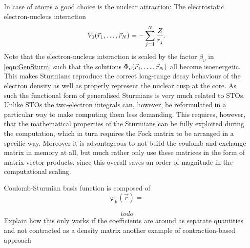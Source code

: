 In case of atoms a good choice is the nuclear attraction:
The electrostatic electron-nucleus interaction
\[
	V_0(\vec{r}_1, \ldots, \vec{r}_N) = - \sum_{j=1}^N \frac{Z}{r_j}.
\]
Note that the electron-nucleus interaction is scaled by the factor $\beta_\nu$ in \eqref{eqn:GenSturm}
such that the solutions $\Phi_\nu(\vec{r}_1, \ldots, \vec{r}_N)$ all become isoenergetic.
This makes Sturmians reproduce the correct long-range decay behaviour of the electron density
as well as properly represent the nuclear cusp at the core.
As such the functional form of generalised Sturmians is very much related to STOs.
Unlike STOs the two-electron integrals can, however, be reformulated in a particular way
to make computing them less demanding.
This requires, however, that the mathematical properties of the Sturmians
can be fully exploited during the computation,
which in turn requires the Fock matrix to be arranged in a specific way.
Moreover it is advantageous to not build the coulomb and exchange matrix in memory at all,
but much rather only use these matrices in the form of matrix-vector products,
since this overall saves an order of magnitude in the computational scaling.


Coulomb-Sturmian basis function is composed of
\[ \varphi_\mu(\vec{r}) = \]



\begin{equation}
	todo
	\label{eqn:ApplicationKcs}
\end{equation}
Explain how this only works if the coefficients are around as separate quantities
and not contracted as a density matrix
another example of contraction-based approach



